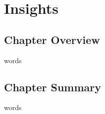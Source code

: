%
%


%
%

\chapter{Insights}
\label{ch:insights}

%
%
\section{Chapter Overview}
\label{ch:insights:overview}
words




%
%
\section{Chapter Summary}
\label{ch:insights:summary}
words





